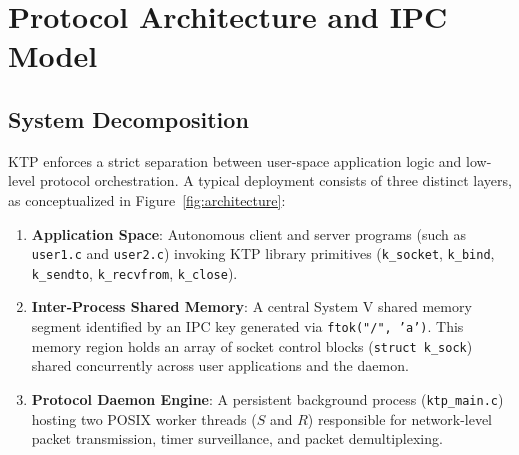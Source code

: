 \documentclass[11pt,a4paper]{article}
\begin{document}
\section{Protocol Architecture and IPC Model}
\label{sec:architecture}

\subsection{System Decomposition}
KTP enforces a strict separation between user-space application logic and low-level protocol orchestration. A typical deployment consists of three distinct layers, as conceptualized in Figure~\ref{fig:architecture}:
\begin{enumerate}
    \item \textbf{Application Space}: Autonomous client and server programs (such as \texttt{user1.c} and \texttt{user2.c}) invoking KTP library primitives (\texttt{k\_socket}, \texttt{k\_bind}, \texttt{k\_sendto}, \texttt{k\_recvfrom}, \texttt{k\_close}).
    \item \textbf{Inter-Process Shared Memory}: A central System V shared memory segment identified by an IPC key generated via \texttt{ftok("/", 'a')}. This memory region holds an array of socket control blocks (\texttt{struct k\_sock}) shared concurrently across user applications and the daemon.
    \item \textbf{Protocol Daemon Engine}: A persistent background process (\texttt{ktp\_main.c}) hosting two POSIX worker threads ($S$ and $R$) responsible for network-level packet transmission, timer surveillance, and packet demultiplexing.
\end{enumerate}
\end{document}
